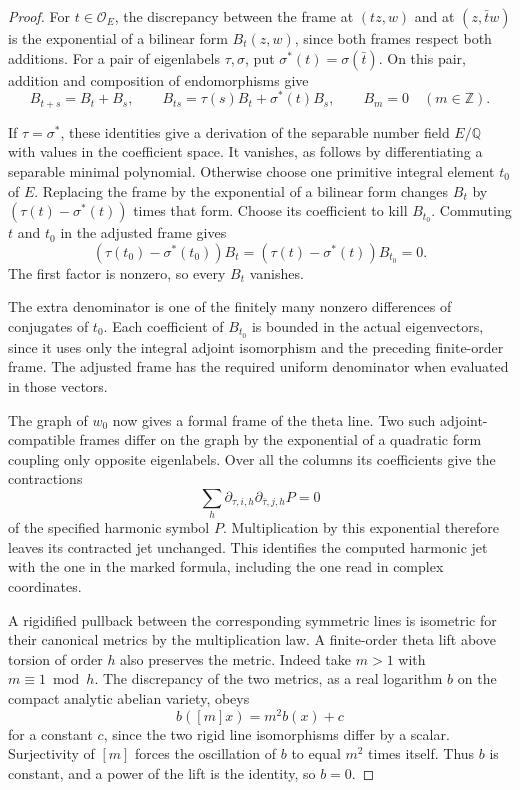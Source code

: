 \begin{proof}
For \(t\in\mathcal O_E\), the discrepancy between the frame at
\((tz,w)\) and at \((z,\bar t w)\) is the exponential of a bilinear
form \(B_t(z,w)\), since both frames respect both additions.
For a pair of eigenlabels \(\tau,\sigma\), put
\(\sigma^*(t)=\sigma(\bar t)\). On this pair, addition and composition
of endomorphisms give
\[
 B_{t+s}=B_t+B_s,\qquad
 B_{ts}=\tau(s)B_t+\sigma^*(t)B_s,\qquad B_m=0\quad(m\in\mathbb Z).
\]

If \(\tau=\sigma^*\), these identities give a derivation of the
separable number field \(E/\mathbb Q\) with values in the coefficient
space. It vanishes, as follows by differentiating a separable
minimal polynomial. Otherwise choose one primitive integral element
\(t_0\) of \(E\). Replacing the frame by the exponential of a
bilinear form changes \(B_t\) by
\((\tau(t)-\sigma^*(t))\) times that form. Choose its coefficient
to kill \(B_{t_0}\). Commuting \(t\) and \(t_0\) in the adjusted frame gives
\[
       (\tau(t_0)-\sigma^*(t_0))B_t
           =(\tau(t)-\sigma^*(t))B_{t_0}=0 .
\]
The first factor is nonzero, so every \(B_t\) vanishes.

The extra denominator is one of the finitely many nonzero
differences of conjugates of \(t_0\). Each coefficient of
\(B_{t_0}\) is bounded in the actual eigenvectors, since it
uses only the integral adjoint isomorphism and the preceding
finite-order frame. The adjusted frame has the required uniform
denominator when evaluated in those vectors.

The graph of \(w_0\) now gives a formal frame of the theta line.
Two such adjoint-compatible frames differ on the graph by the
exponential of a quadratic form coupling only opposite eigenlabels.
Over all the columns its coefficients give the contractions
\[
       \sum_h\partial_{\tau,i,h}\partial_{\bar\tau,j,h} P=0
\]
of the specified harmonic symbol \(P\). Multiplication by this
exponential therefore leaves its contracted jet unchanged. This
identifies the computed harmonic jet with the one in the marked
formula, including the one read in complex coordinates.

A rigidified pullback between the corresponding symmetric lines
is isometric for their canonical metrics by the multiplication
law. A finite-order theta lift above torsion of order \(h\) also
preserves the metric. Indeed take \(m>1\) with \(m\equiv1\bmod h\).
The discrepancy of the two metrics, as a real logarithm \(b\) on
the compact analytic abelian variety, obeys
\[
                  b([m]x)=m^2 b(x)+c
\]
for a constant \(c\), since the two rigid line isomorphisms differ
by a scalar. Surjectivity of \([m]\) forces the oscillation of \(b\)
to equal \(m^2\) times itself. Thus \(b\) is constant, and a power
of the lift is the identity, so \(b=0\).


\end{proof}
